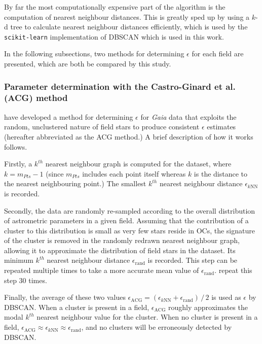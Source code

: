 By far the most computationally expensive part of the algorithm is the computation of nearest neighbour distances. This is greatly sped up by using a $k$-d tree to calculate nearest neighbour distances efficiently, which is used by the \texttt{scikit-learn} \citep{pedregosa_scikit-learn_2011} implementation of DBSCAN which is used in this work.

In the following subsections, two methods for determining $\epsilon$ for each field are presented, which are both be compared by this study.


\subsubsection{Parameter determination with the Castro-Ginard et al. (ACG) method}

\cite{castro-ginard_new_2018} have developed a method for determining $\epsilon$ for \emph{Gaia} data that exploits the random, unclustered nature of field stars to produce consistent $\epsilon$ estimates (hereafter abbreviated as the ACG method.) A brief description of how it works follows. 

Firstly, a $k^{th}$ nearest neighbour graph is computed for the dataset, where $k = m_{Pts} - 1$ (since $m_{Pts}$ includes each point itself whereas $k$ is the distance to the nearest neighbouring point.) The smallest $k^{th}$ nearest neighbour distance $\epsilon_{k\text{NN}}$ is recorded. 

Secondly, the data are randomly re-sampled according to the overall distribution of astrometric parameters in a given field. Assuming that the contribution of a cluster to this distribution is small as very few stars reside in OCs, the signature of the cluster is removed in the randomly redrawn nearest neighbour graph, allowing it to approximate the distribution of field stars in the dataset. Its minimum $k^{th}$ nearest neighbour distance $\epsilon_{\text{rand}}$ is recorded. This step can be repeated multiple times to take a more accurate mean value of $\epsilon_{\text{rand}}$. \cite{castro-ginard_new_2018} repeat this step 30 times.

Finally, the average of these two values $\epsilon_{\text{ACG}} = (\epsilon_{k\text{NN}} + \epsilon_{\text{rand}}) \, / \, 2$ is used as $\epsilon$ by DBSCAN. When a cluster is present in a field, $\epsilon_{\text{ACG}}$ roughly approximates the modal $k^{th}$ nearest neighbour value for the cluster. When no cluster is present in a field, $\epsilon_{\text{ACG}} \approx \epsilon_{k\text{NN}} \approx \epsilon_{\text{rand}}$, and no clusters will be erroneously detected by DBSCAN.

